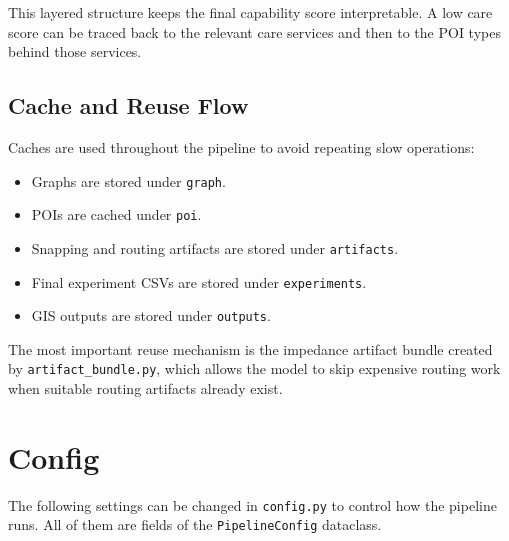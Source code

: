 \documentclass[11pt]{article}
\begin{document}
This layered structure keeps the final capability score interpretable. A low care score can be traced back to the relevant care services and then to the POI types behind those services.

\subsection*{Cache and Reuse Flow}

Caches are used throughout the pipeline to avoid repeating slow operations:

\begin{itemize}
  \item Graphs are stored under \texttt{graph}.
  \item POIs are cached under \texttt{poi}.
  \item Snapping and routing artifacts are stored under \texttt{artifacts}.
  \item Final experiment CSVs are stored under \texttt{experiments}.
  \item GIS outputs are stored under \texttt{outputs}.
\end{itemize}

The most important reuse mechanism is the impedance artifact bundle created by \texttt{artifact\_bundle.py}, which allows the model to skip expensive routing work when suitable routing artifacts already exist.

\section{Config}

The following settings can be changed in \texttt{config.py} to control how the pipeline runs. All of them are fields of the \texttt{PipelineConfig} dataclass.
\end{document}
